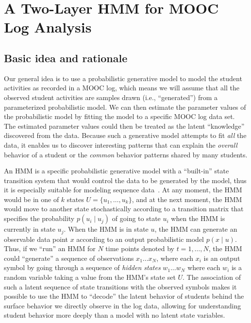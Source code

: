 \section{A Two-Layer HMM for MOOC Log Analysis}

\subsection{Basic idea and rationale}

Our general idea is to use a probabilistic generative model to model the
student activities as recorded in a MOOC log, which means we will assume
that all the observed student activities are samples drawn (i.e.,
``generated'') from a parameterized probabilistic model. We can then
estimate the parameter values of the probabilistic model by fitting the
model to a specific MOOC log data set. The estimated parameter values could
then be treated as the latent ``knowledge'' discovered from the data.
Because such a generative model attempts to fit \emph{all} the data, it
enables us to discover interesting patterns that can explain the
\emph{overall} behavior of a student or the \emph{common} behavior patterns
shared by many students.

An HMM is a specific probabilistic generative model with a ``built-in''
state transition system that would control the data to be generated by the
model, thus it is especially suitable for modeling sequence
data~\cite{Rabiner:1990:RSR, Huang:1990:HMM}. At any moment, the HMM would
be in one of $k$ states $U=\{u_1,\ldots,u_k\}$, and at the next moment, the
HMM would move to another state stochastically according to a transition
matrix that specifies the probability $p(u_i \mid u_j)$ of going to state
$u_i$ when the HMM is currently in state $u_j$. When the HMM is in state
$u$, the HMM can generate an observable data point $x$ according to an
output probabilistic model $p(x \mid u)$. Thus, if we ``run'' an HMM for $N$
time points denoted by $t=1,\ldots,N$, the HMM could ``generate'' a sequence
of observations $x_1 \ldots x_N$, where each $x_i$ is an output symbol by
going through a sequence of \emph{hidden states} $w_1 \ldots w_N$ where
each $w_i$ is a random variable taking a value from the HMM's state set
$U$. The association of such a latent sequence of state transitions with
the observed symbols makes it possible to use the HMM to ``decode'' the
latent behavior of students behind the surface behavior we directly observe
in the log data, allowing for understanding student behavior more deeply
than a model with no latent state variables.

